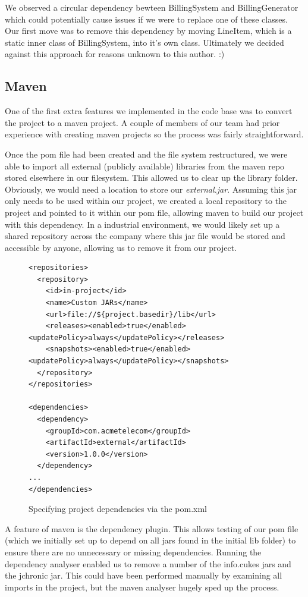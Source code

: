 \documentclass[a4paper]{article}
\begin{document}
We observed a circular dependency bewteen BillingSystem and BillingGenerator which
could potentially cause issues if we were to replace one of these classes. Our
first move was to remove this dependency by moving LineItem, which is a static inner class
of BillingSystem, into it's own class. Ultimately we decided against this approach
for reasons unknown to this author. :)


\subsection{Maven}

One of the first extra features we implemented in the code base was to
convert the project to a maven project. A couple of members of our team
had prior experience with creating maven projects so the process was fairly
straightforward. 

Once the pom file had been created and the file system restructured, we were
able to import all external (publicly available) libraries from the maven repo
stored elsewhere in our filesystem. This allowed us to clear up the library folder.
Obviously, we would need a location to store our \emph{external.jar}. Assuming this
jar only needs to be used within our project, we created a local repository to
the project and pointed to it within our pom file, allowing maven to build our
project with this dependency. In a industrial environment, we would likely set
up a shared repository across the company where this jar file would be stored
and accessible by anyone, allowing us to remove it from our project.

\begin{figure}[h]
\begin{verbatim}  
<repositories>
  <repository>
    <id>in-project</id>
    <name>Custom JARs</name>
    <url>file://${project.basedir}/lib</url>
    <releases><enabled>true</enabled><updatePolicy>always</updatePolicy></releases>
    <snapshots><enabled>true</enabled><updatePolicy>always</updatePolicy></snapshots>
  </repository>
</repositories>

<dependencies>
  <dependency>
    <groupId>com.acmetelecom</groupId>
    <artifactId>external</artifactId>
    <version>1.0.0</version>
  </dependency>
...
</dependencies>
\end{verbatim}
\caption{Specifying project dependencies via the pom.xml}
\end{figure}
A feature of maven is the dependency plugin. This allows testing of our pom file
(which we initially set up to depend on all jars found in the initial lib folder)
to ensure there are no unnecessary or missing dependencies. Running the
dependency analyser enabled us to remove a number of the info.cukes jars and
the jchronic jar. This could have been performed manually by examining all imports
in the project, but the maven analyser hugely sped up the process.
\end{document}
